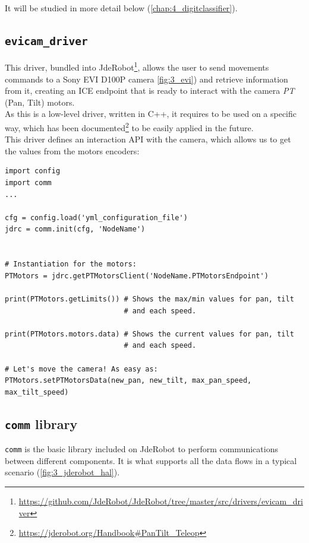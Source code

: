 		It will be studied in more detail below (\autoref{chap:4_digitclassifier}).
	
	
	\subsection{\texttt{evicam\_driver}}
	\label{sec:3_evicam_driver}
	This driver, bundled into JdeRobot\footnote{\url{https://github.com/JdeRobot/JdeRobot/tree/master/src/drivers/evicam\_driver}}, allows the user to send movements commands to a Sony EVI D100P camera \autoref{fig:3_evi}) and retrieve information from it, creating an ICE endpoint that is ready to interact with the camera \emph{PT} (Pan, Tilt) motors.\\
	
	As this is a low-level driver, written in C++, it requires to be used on a specific way, which has been documented\footnote{\url{https://jderobot.org/Handbook\#PanTilt_Teleop}} to be easily applied in the future.\\
	
	This driver defines an interaction API with the camera, which allows us to get the values from the motors encoders:
	\begin{lstlisting}
import config
import comm
...

cfg = config.load('yml_configuration_file')
jdrc = comm.init(cfg, 'NodeName')


# Instantiation for the motors:
PTMotors = jdrc.getPTMotorsClient('NodeName.PTMotorsEndpoint')

print(PTMotors.getLimits()) # Shows the max/min values for pan, tilt 
                            # and each speed.

print(PTMotors.motors.data) # Shows the current values for pan, tilt
                            # and each speed.

# Let's move the camera! As easy as:
PTMotors.setPTMotorsData(new_pan, new_tilt, max_pan_speed, max_tilt_speed)
	\end{lstlisting}
	
	\subsection{\texttt{comm} library}
		\label{sec:3_comm}
		\texttt{comm} is the basic library included on JdeRobot to perform communications between different components. It is what supports all the data flows in a typical scenario (\autoref{fig:3_jderobot_hal}).\\
		
